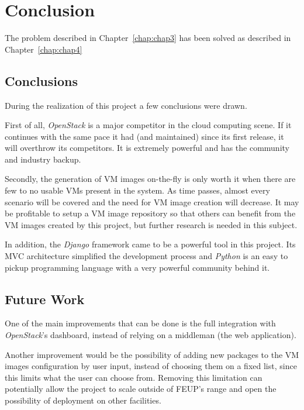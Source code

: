 \chapter{Conclusion} \label{chap:concl}

The problem described in Chapter~\ref{chap:chap3} has been solved as described in Chapter~\ref{chap:chap4}

\section{Conclusions}\label{sec:conclusions}

During the realization of this project a few conclusions were drawn.

First of all, \textit{OpenStack} is a major competitor in the cloud computing scene. If it continues with the same pace it had (and maintained) since its first release, it will overthrow its competitors. It is extremely powerful and has the community and industry backup.

Secondly, the generation of VM images on-the-fly is only worth it when there are few to no usable VMs present in the system. As time passes, almost every scenario will be covered and the need for VM image creation will decrease. It may be profitable to setup a VM image repository so that others can benefit from the VM images created by this project, but further research is needed in this subject.

In addition, the \textit{Django} framework came to be a powerful tool in this project. Its MVC architecture simplified the development process and \textit{Python} is an easy to pickup programming language with a very powerful community behind it.

\section{Future Work}\label{sec:future-work}

One of the main improvements that can be done is the full integration with \textit{OpenStack}'s dashboard, instead of relying on a middleman (the web application).

Another improvement would be the possibility of adding new packages to the VM images configuration by user input, instead of choosing them on a fixed list, since this limits what the user can choose from. Removing this limitation can potentially allow the project to scale outside of FEUP's range and open the possibility of deployment on other facilities.
